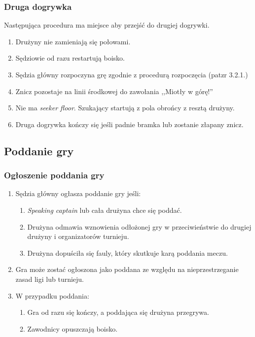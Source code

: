 \documentclass[11pt,a4paper]{article}
\begin{document}
\subsubsection{Druga dogrywka}
Następująca procedura ma miejsce aby przejść do drugiej dogrywki.
\begin{enumerate}
  \item Drużyny nie zamieniają się połowami.
  \item Sędziowie od razu restartują boisko.
  \item Sędzia główny rozpoczyna grę zgodnie z procedurą rozpoczęcia (patzr 3.2.1.) %
  \item Znicz pozostaje na linii środkowej do zawołania ,,Miotły w górę!''
  \item Nie ma \emph{seeker floor}. Szukający startują z pola obrońcy z resztą drużyny.
  \item Druga dogrywka kończy się jeśli padnie bramka lub zostanie złapany znicz.
\end{enumerate}

\subsection{Poddanie gry}

\subsubsection{Ogłoszenie poddania gry}
\begin{enumerate}
  \item Sędzia główny ogłasza poddanie gry jeśli:
  \begin{enumerate}
    \item \emph{Speaking captain} lub cała drużyna chce się poddać.
    \item Drużyna odmawia wznowienia odłożonej gry w przeciwieństwie do drugiej drużyny i organizatorów turnieju.
    \item Drużyna dopuściła się fauly, który skutkuje karą poddania meczu.
  \end{enumerate}
  \item Gra może zostać ogłoszona jako poddana ze względu na nieprzestrzeganie zasad ligi lub turnieju.
  \item W przypadku poddania:
  \begin{enumerate}
    \item Gra od razu się kończy, a poddająca się drużyna przegrywa.
    \item Zawodnicy opuszczają boisko.
  \end{enumerate}
\end{enumerate}
\end{document}
